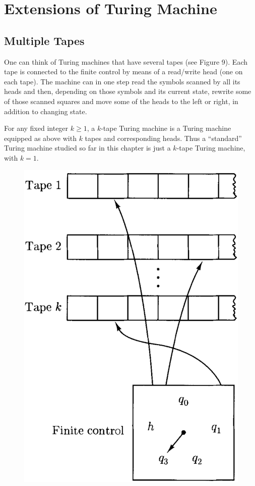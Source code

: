 \section{Extensions of Turing Machine}
\label{sec:exten-of-tm}

\subsection{Multiple Tapes}

One can think of Turing machines that have several tapes (see Figure 9). Each tape is connected to the finite control by means of a read/write head (one on each tape). The machine can in one step read the symbols scanned by all its heads and then, depending on those symbols and its current state, rewrite some of those scanned squares and move some of the heads to the left or right, in addition to changing state.

For any fixed integer $k \geq 1$, a $k$-tape Turing machine is a Turing machine equipped as above with $k$ tapes and corresponding heads. Thus a ``standard'' Turing machine studied so far in this chapter is just a $k$-tape Turing machine, with $k = 1$.
\begin{figure}[H]
  \centering
  \includegraphics[width=.9\linewidth]{img/fig-4.14.png}
  \caption{}
  \label{fig:4.9}
\end{figure}

